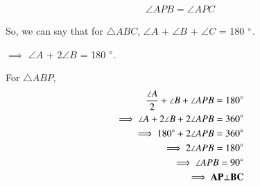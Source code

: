 \documentclass[journal,12pt,twocolumn]{IEEEtran}
\renewcommand\thesection{\arabic{section}}
\begin{document}
\begin{align}
\angle APB = \angle APC
\end{align}

So, we can say that for $\triangle ABC$, $\angle A$ + $\angle B$ + $\angle C$ = 180 $\degree$.

$\implies$ $\angle A$ + 2$\angle B$ = 180 $\degree$.

For $\triangle ABP$,
\begin{align}
\frac{\angle A}{2} + \angle B + \angle APB = 180 \degree\\
\implies \angle A + 2 \angle B + 2\angle APB = 360 \degree\\
\implies 180 \degree + 2\angle APB = 360 \degree\\
\implies 2\angle APB = 180 \degree\\
\implies \angle APB = 90 \degree\\
\implies \mathbf{AP} \bot \mathbf{BC}
\end{align}


\renewcommand{\theequation}{\theenumi}
%
\end{document}
